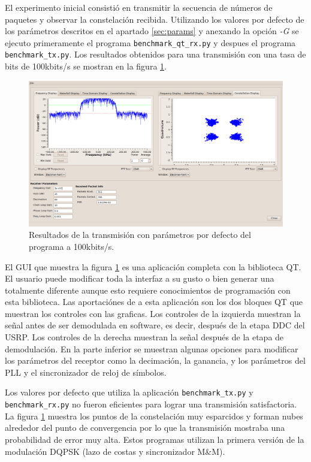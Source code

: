 El experimento inicial consisti\'o en transmitir la secuencia de n\'umeros de paquetes y
observar la constelaci\'on recibida. Utilizando los valores por defecto de los par\'ametros descritos en
el apartado \ref{sec:params} y anexando la opci\'on \emph{-G} se ejecuto primeramente el programa
\verb|benchmark_qt_rx.py| y despues el programa \verb|benchmark_tx.py|. Los resultados obtenidos para una transmisi\'on con una
tasa de bits de 100kbits/s se mostran en la figura \ref{fig:dqpsktrans}.

\begin{figure}[htp]
  \centering
  \includegraphics[width=5.9in]{figs/dqpsktrans}
  \vspace{0.3in}
  \caption{Resultados de la transmisi\'on con par\'ametros por defecto del programa a 100kbits/s.}
  \label{fig:dqpsktrans}
\end{figure}

El GUI que muestra la figura \ref{fig:dqpsktrans} es una aplicaci\'on completa con la biblioteca QT.
El usuario puede modificar toda la interfaz a su gusto o bien generar una totalmente diferente aunque
esto requiere conocimientos de programaci\'on con esta biblioteca. Las aportaci\'ones de \gnuradio a
esta aplicaci\'on son los dos bloques QT que muestran los controles con las graficas. Los controles
de la izquierda muestran la se\~nal antes de ser demodulada en software, es decir, despu\'es de la
etapa DDC del USRP. Los controles de la derecha muestran la se\~nal despu\'es de la etapa de
demodulaci\'on. En la parte inferior se muestran algunas opciones para modificar los par\'ametros
del receptor como la decimaci\'on, la ganancia, y los par\'ametros del PLL y el sincronizador de
reloj de s\'imbolos.

Los valores por defecto que utiliza la aplicaci\'on \verb|benchmark_tx.py| y \\
\verb|benchmark_rx.py| no fueron eficientes para lograr una transmisi\'on satisfactoria. La figura
\ref{fig:dqpsktrans} muestra los puntos de la constelaci\'on muy esparcidos y forman nubes alrededor
del punto de convergencia por lo que la transmisi\'on mostraba una probabilidad de error muy alta.
Estos programas utilizan la primera versi\'on de la modulaci\'on DQPSK (lazo de costas y sincronizador
M\&M).

